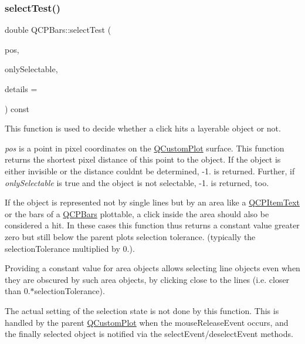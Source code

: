 \mbox{\label{class_q_c_p_bars_a62d66cc8eedca6bedfc1f6513164d418}} 
\subsubsection{\texorpdfstring{select\+Test()}{selectTest()}}
{\footnotesize\ttfamily double Q\+C\+P\+Bars\+::select\+Test (\begin{DoxyParamCaption}\item[{const Q\+PointF \&}]{pos,  }\item[{bool}]{only\+Selectable,  }\item[{Q\+Variant $\ast$}]{details = {} }\end{DoxyParamCaption}) const\hspace{0.3cm}{\ttfamily [virtual]}}

This function is used to decide whether a click hits a layerable object or not.

{\itshape pos} is a point in pixel coordinates on the \hyperlink{class_q_custom_plot}{Q\+Custom\+Plot} surface. This function returns the shortest pixel distance of this point to the object. If the object is either invisible or the distance couldn\textquotesingle{}t be determined, -\/1. is returned. Further, if {\itshape only\+Selectable} is true and the object is not selectable, -\/1. is returned, too.

If the object is represented not by single lines but by an area like a \hyperlink{class_q_c_p_item_text}{Q\+C\+P\+Item\+Text} or the bars of a \hyperlink{class_q_c_p_bars}{Q\+C\+P\+Bars} plottable, a click inside the area should also be considered a hit. In these cases this function thus returns a constant value greater zero but still below the parent plot\textquotesingle{}s selection tolerance. (typically the selection\+Tolerance multiplied by 0.).

Providing a constant value for area objects allows selecting line objects even when they are obscured by such area objects, by clicking close to the lines (i.\+e. closer than 0.$\ast$selection\+Tolerance).

The actual setting of the selection state is not done by this function. This is handled by the parent \hyperlink{class_q_custom_plot}{Q\+Custom\+Plot} when the mouse\+Release\+Event occurs, and the finally selected object is notified via the select\+Event/deselect\+Event methods.

